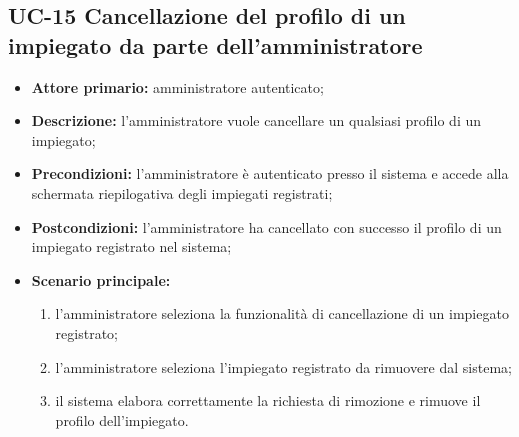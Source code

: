 \subsection{UC-15 Cancellazione del profilo di un impiegato da parte dell'amministratore}
\begin{itemize}
	\item \textbf{Attore primario:} amministratore autenticato;

	\item \textbf{Descrizione:} l'amministratore vuole cancellare un qualsiasi profilo di un impiegato;

	\item \textbf{Precondizioni:} l'amministratore è autenticato presso il sistema e accede alla schermata riepilogativa degli impiegati registrati;

	\item \textbf{Postcondizioni:} l'amministratore ha cancellato con successo il profilo di un impiegato registrato nel sistema;

	\item \textbf{Scenario principale:}
	
	\begin{enumerate}
    	\item l'amministratore seleziona la funzionalità di cancellazione di un impiegato registrato;
   	    \item l'amministratore seleziona l'impiegato registrato da rimuovere dal sistema;
 	    \item il sistema elabora correttamente la richiesta di rimozione e rimuove il profilo dell'impiegato.
	\end{enumerate}

\end{itemize}


